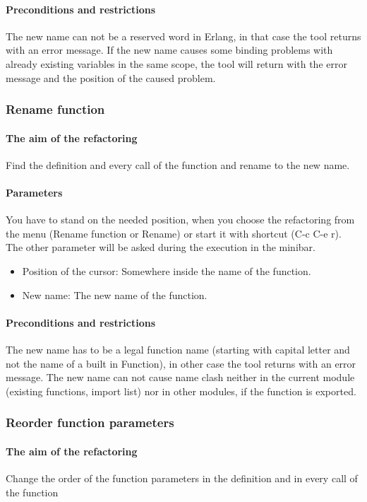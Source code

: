 \documentclass[12pt]{article}
\begin{document}
\paragraph{Preconditions and restrictions}
The new name can not be a reserved word in Erlang, in that case the tool returns with an error message.
If the new name causes some binding problems with already existing variables in the same scope,
the tool will return with the error message and the position of the caused problem.


\subsubsection{Rename function}
\paragraph{The aim of the refactoring}
Find the definition and every call of the function and rename to the new name.
\paragraph{Parameters}
You have to stand on the needed position, when you choose the refactoring from 
the menu (Rename function or Rename) or start it with shortcut (C-c C-e r).
The other parameter will be asked during the execution in the minibar.
\begin{itemize}
	\item Position of the cursor: Somewhere inside the name of the function.
	\item New name: The new name of the function.
\end{itemize}
\paragraph{Preconditions and restrictions}
The new name has to be a legal function name (starting with capital letter and not the name of a built in Function), 
in other case the tool returns with an error message.
The new name can not cause name clash neither in the current module (existing functions, import list) 
nor in other modules, if the function is exported.

\subsubsection{Reorder function parameters}
\paragraph{The aim of the refactoring}
Change the order of the function parameters in the definition and in every call of the function
\end{document}
